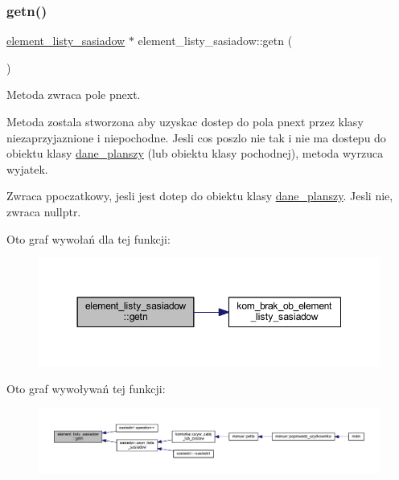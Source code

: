 \subsubsection{\texorpdfstring{getn()}{getn()}}
{\footnotesize\ttfamily \mbox{\hyperlink{classelement__listy__sasiadow}{element\+\_\+listy\+\_\+sasiadow}} $\ast$ element\+\_\+listy\+\_\+sasiadow\+::getn (\begin{DoxyParamCaption}{ }\end{DoxyParamCaption})}

Metoda zwraca pole pnext.

Metoda zostala stworzona aby uzyskac dostep do pola pnext przez klasy niezaprzyjaznione i niepochodne. Jesli cos poszlo nie tak i nie ma dostepu do obiektu klasy \mbox{\hyperlink{classdane__planszy}{dane\+\_\+planszy}} (lub obiektu klasy pochodnej), metoda wyrzuca wyjatek. \begin{DoxyReturn}{Zwraca}
ppoczatkowy, jesli jest dotep do obiektu klasy \mbox{\hyperlink{classdane__planszy}{dane\+\_\+planszy}}. Jesli nie, zwraca nullptr. 
\end{DoxyReturn}
Oto graf wywołań dla tej funkcji\+:
\nopagebreak
\begin{figure}[H]
\begin{center}
\leavevmode
\includegraphics[width=350pt]{classelement__listy__sasiadow_a2c1eabc63e606d142bcf66c648b0e9d0_cgraph}
\end{center}
\end{figure}
Oto graf wywoływań tej funkcji\+:
\nopagebreak
\begin{figure}[H]
\begin{center}
\leavevmode
\includegraphics[width=350pt]{classelement__listy__sasiadow_a2c1eabc63e606d142bcf66c648b0e9d0_icgraph}
\end{center}
\end{figure}
\mbox{\label{classelement__listy__sasiadow_a98ac4971a69b17a96fb7689abb5e1b58}} 
